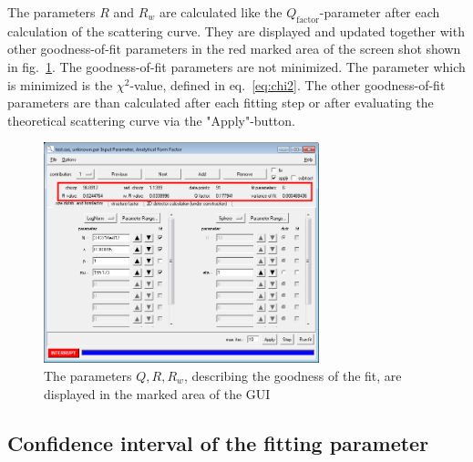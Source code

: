 \vspace{5mm}

The parameters $R$ and $R_w$ are calculated like the $Q_\text{factor}$-parameter after each calculation of the scattering curve. They are displayed and updated together with other goodness-of-fit parameters in the red marked area of the screen shot shown in fig.\ \ref{fig:GoodnessParGUI}. The goodness-of-fit parameters are not minimized. The parameter which is minimized is the $\chi^2$-value, defined in eq.\ \ref{eq:chi2}. The other goodness-of-fit parameters are than calculated after each fitting step or after evaluating the theoretical scattering curve via the "Apply"-button.

\begin{figure}[htb]
\begin{center}
\includegraphics[width=0.712\textwidth,height=0.571\textwidth]{../images/related_pages/goodnessOFfitPAR.png}
\end{center}
\caption{The parameters $Q, R,R_w$, describing the goodness of the fit, are displayed in the marked area of the GUI}
\label{fig:GoodnessParGUI}
\end{figure}

\subsection{Confidence interval of the fitting parameter}
~\\

